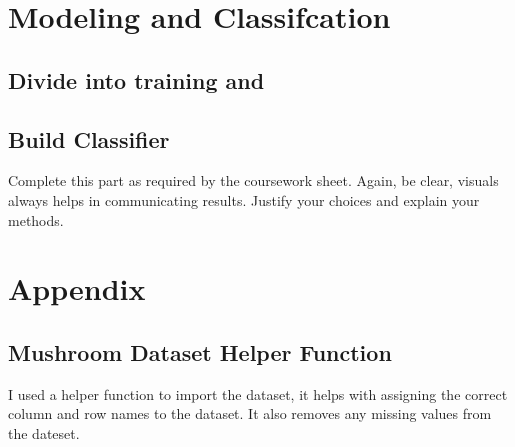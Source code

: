 \documentclass[10pt  ,usenames, dvipsnames]{article}\usepackage[]{graphicx}\usepackage[]{color}
\begin{document}
\section {Modeling and Classifcation}



\subsection {Divide into training and}


\subsection{Build Classifier}


Complete this part as required by the coursework sheet. Again, be clear, visuals always helps in communicating results. Justify your choices and explain your methods. 















\clearpage

\section{Appendix}\label{pubs}

\subsection{Mushroom Dataset Helper Function}

I used a helper function to import the dataset, it helps with assigning the correct column and row names to the dataset. It also removes any missing values from the dateset.
\end{document}
